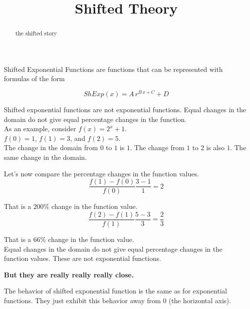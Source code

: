 \documentclass{ximera}
\title{Shifted Theory}
\begin{document}
\begin{abstract}
the shifted story
\end{abstract}
\maketitle





Shifted Exponential Functions are functions that can be represented with formulas of the form

\[
ShExp(x) = A \, r^{B \, x + C} + D
\]



Shifted exponential functions are not exponential functions.  Equal changes in the domain do not give equal percentage changes in the function. \\



As an example, consider $f(x) = 2^{x} + 1$. \\


$f(0) = 1$, $f(1) = 3$, and $f(2) = 5$. \\

The change in the domain from $0$ to $1$ is $1$.  The change from $1$ to $2$ is also $1$. The same change in the domain.

Let's now compare the percentage changes in the function values. \\



\[
\frac{f(1) - f(0)}{f(0)} \frac{3 - 1}{1} = 2
\]

That is a $200\%$ change in the function value. \\





\[
\frac{f(2) - f(1)}{f(1)} \frac{5 - 3}{3} = \frac{2}{3}
\]

That is a $66\%$ change in the function value. \\




Equal changes in the domain do not give equal percentage changes in the function values.   These are not exponential functions.


\begin{center}
\textbf{But they are really really really close.} \\
\end{center}


The behavior of shifted exponential function is the same as for exponential functions.  They just exhibit this behavior away from $0$ (the horizontal axis).\\
\end{document}
